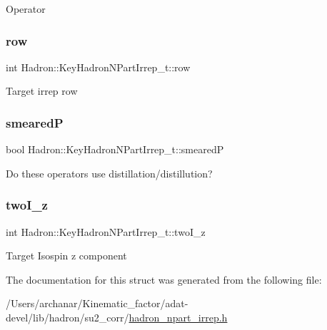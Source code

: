 Operator \mbox{\label{structHadron_1_1KeyHadronNPartIrrep__t_ac3322541750f4854d3af8e39c40148f0}} 
\subsubsection{\texorpdfstring{row}{row}}
{\footnotesize\ttfamily int Hadron\+::\+Key\+Hadron\+N\+Part\+Irrep\+\_\+t\+::row}

Target irrep row \mbox{\label{structHadron_1_1KeyHadronNPartIrrep__t_adc168c5e032072a880936aefb45a3e1e}} 
\subsubsection{\texorpdfstring{smearedP}{smearedP}}
{\footnotesize\ttfamily bool Hadron\+::\+Key\+Hadron\+N\+Part\+Irrep\+\_\+t\+::smearedP}

Do these operators use distillation/distillution? \mbox{\label{structHadron_1_1KeyHadronNPartIrrep__t_ad84ecd917052923a7f2c690ab2730dfa}} 
\subsubsection{\texorpdfstring{twoI\_z}{twoI\_z}}
{\footnotesize\ttfamily int Hadron\+::\+Key\+Hadron\+N\+Part\+Irrep\+\_\+t\+::two\+I\+\_\+z}

Target Isospin z component 

The documentation for this struct was generated from the following file\+:\begin{DoxyCompactItemize}
\item 
/\+Users/archanar/\+Kinematic\+\_\+factor/adat-\/devel/lib/hadron/su2\+\_\+corr/\mbox{\hyperlink{adat-devel_2lib_2hadron_2su2__corr_2hadron__npart__irrep_8h}{hadron\+\_\+npart\+\_\+irrep.\+h}}\end{DoxyCompactItemize}
